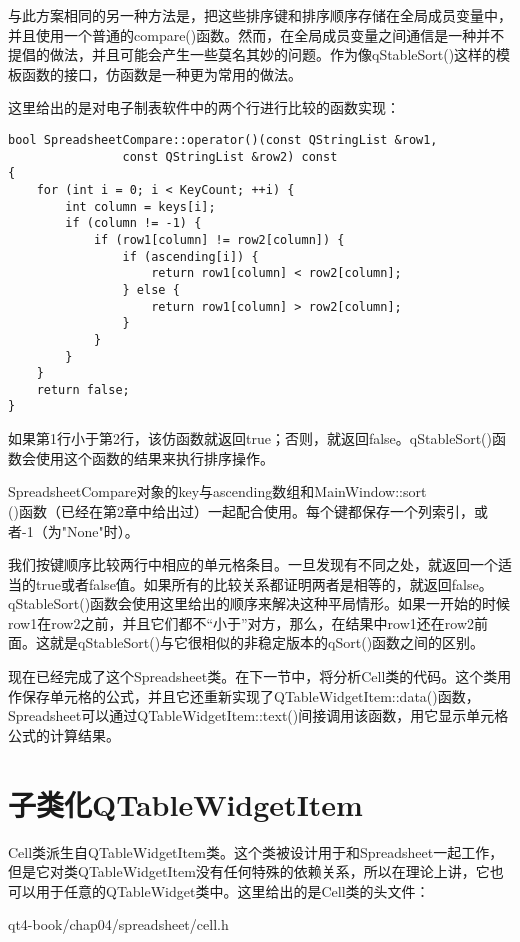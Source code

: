 \documentclass[11pt,oneside]{book}
\begin{document}
\begin{common-format}
与此方案相同的另一种方法是，把这些排序键和排序顺序存储在全局成员变量中，并且使用一个普通的compare()函数。然而，在全局成员变量之间通信是一种并不提倡的做法，并且可能会产生一些莫名其妙的问题。作为像qStableSort()这样的模板函数的接口，仿函数是一种更为常用的做法。

这里给出的是对电子制表软件中的两个行进行比较的函数实现：
\begin{Verbatim}
bool SpreadsheetCompare::operator()(const QStringList &row1,
                const QStringList &row2) const
{
    for (int i = 0; i < KeyCount; ++i) {
        int column = keys[i];
        if (column != -1) {
            if (row1[column] != row2[column]) {
                if (ascending[i]) {
                    return row1[column] < row2[column];
                } else {
                    return row1[column] > row2[column];
                }
            }
        }
    }
    return false;
}
\end{Verbatim}

如果第1行小于第2行，该仿函数就返回true；否则，就返回false。qStableSort()函数会使用这个函数的结果来执行排序操作。

SpreadsheetCompare对象的key与ascending数组和MainWindow::sort\\()函数（已经在第2章中给出过）一起配合使用。每个键都保存一个列索引，或者-1（为"None"时）。

我们按键顺序比较两行中相应的单元格条目。一旦发现有不同之处，就返回一个适当的true或者false值。如果所有的比较关系都证明两者是相等的，就返回false。qStableSort()函数会使用这里给出的顺序来解决这种平局情形。如果一开始的时候row1在row2之前，并且它们都不“小于”对方，那么，在结果中row1还在row2前面。这就是qStableSort()与它很相似的非稳定版本的qSort()函数之间的区别。 

现在已经完成了这个Spreadsheet类。在下一节中，将分析Cell类的代码。这个类用作保存单元格的公式，并且它还重新实现了QTableWidgetItem::data()函数，Spreadsheet可以通过QTableWidgetItem::text()间接调用该函数，用它显示单元格公式的计算结果。

\section{子类化QTableWidgetItem}
Cell类派生自QTableWidgetItem类。这个类被设计用于和Spreadsheet一起工作，但是它对类QTableWidgetItem没有任何特殊的依赖关系，所以在理论上讲，它也可以用于任意的QTableWidget类中。这里给出的是Cell类的头文件：

\begin{cppinput}{qt4-book/chap04/spreadsheet/cell.h}
\end{cppinput}


\end{common-format}
\end{document}
